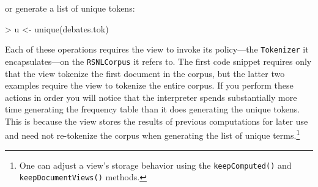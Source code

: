 \documentclass[11pt]{article}
\let\code=\texttt
\let\rclass=\texttt
\begin{document}
or generate a list of unique tokens:
\begin{Schunk}
\begin{Sinput}
> u <- unique(debates.tok)
\end{Sinput}
\end{Schunk}
Each of these operations requires the view to invoke its policy---the
\rclass{Tokenizer} it encapsulates---on the \rclass{RSNLCorpus} it refers
to.  The first code snippet requires only that the view tokenize the
first document in the corpus, but the latter two examples require the
view to tokenize the entire corpus.  If you perform these actions in
order you will notice that the interpreter spends substantially more
time generating the frequency table than it does generating the unique
tokens.  This is because the view stores the results of previous
computations for later use and need not re-tokenize the corpus when
generating the list of unique terms.\footnote{One can adjust a view's
storage behavior using the \code{keepComputed()} and
\code{keepDocumentViews()} methods.}
\end{document}
